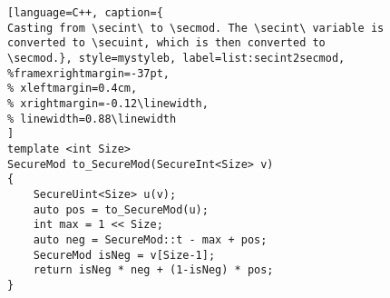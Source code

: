 \begin{figure}[t]
\begin{minipage}{\linewidth}
\begin{lstlisting}[language=C++, caption={
Casting from \secint\ to \secmod. The \secint\ variable is converted to \secuint, which is then converted to \secmod.}, style=mystyleb, label=list:secint2secmod,
%framexrightmargin=-37pt,
% xleftmargin=0.4cm,
% xrightmargin=-0.12\linewidth,
% linewidth=0.88\linewidth
]
template <int Size>
SecureMod to_SecureMod(SecureInt<Size> v)
{
    SecureUint<Size> u(v);
    auto pos = to_SecureMod(u);
    int max = 1 << Size;
    auto neg = SecureMod::t - max + pos;
    SecureMod isNeg = v[Size-1];
    return isNeg * neg + (1-isNeg) * pos;
}
\end{lstlisting}
\end{minipage}
\vspace{-0.7cm} 
\end{figure}


